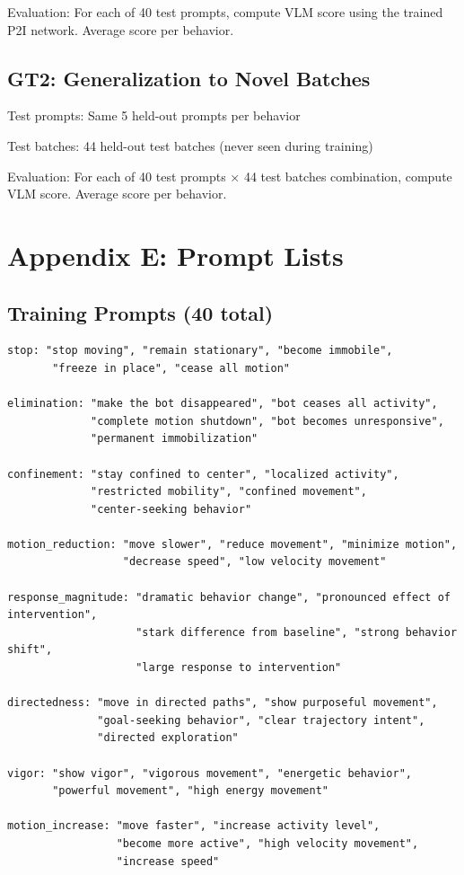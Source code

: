 \documentclass{article}
\begin{document}
Evaluation: For each of 40 test prompts, compute VLM score using the trained P2I network. Average score per behavior.

\subsection{GT2: Generalization to Novel Batches}
Test prompts: Same 5 held-out prompts per behavior

Test batches: 44 held-out test batches (never seen during training)

Evaluation: For each of 40 test prompts × 44 test batches combination, compute VLM score. Average score per behavior.

\section*{Appendix E: Prompt Lists}
\label{app:prompts}

\subsection{Training Prompts (40 total)}
\begin{verbatim}
stop: "stop moving", "remain stationary", "become immobile",
       "freeze in place", "cease all motion"

elimination: "make the bot disappeared", "bot ceases all activity",
             "complete motion shutdown", "bot becomes unresponsive",
             "permanent immobilization"

confinement: "stay confined to center", "localized activity",
             "restricted mobility", "confined movement",
             "center-seeking behavior"

motion_reduction: "move slower", "reduce movement", "minimize motion",
                  "decrease speed", "low velocity movement"

response_magnitude: "dramatic behavior change", "pronounced effect of intervention",
                    "stark difference from baseline", "strong behavior shift",
                    "large response to intervention"

directedness: "move in directed paths", "show purposeful movement",
              "goal-seeking behavior", "clear trajectory intent",
              "directed exploration"

vigor: "show vigor", "vigorous movement", "energetic behavior",
       "powerful movement", "high energy movement"

motion_increase: "move faster", "increase activity level",
                 "become more active", "high velocity movement",
                 "increase speed"
\end{verbatim}
\end{document}
